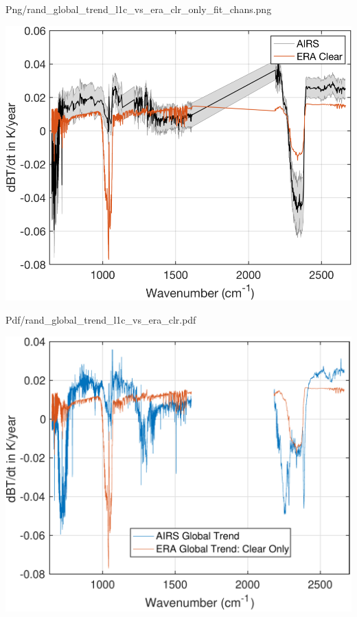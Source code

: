 \documentclass[presentation]{beamer}
\begin{document}
\begin{frame}[label={sec:orgda91197}]{Png/rand\_global\_trend\_l1c\_vs\_era\_clr\_only\_fit\_chans.png}
\begin{center}
\includegraphics[width=0.7\linewidth]{./Figs/Png/rand_global_trend_l1c_vs_era_clr_only_fit_chans.png}
\end{center}
\end{frame}

\begin{frame}[label={sec:org0463493}]{Pdf/rand\_global\_trend\_l1c\_vs\_era\_clr.pdf}
\begin{center}
\includegraphics[width=0.7\linewidth]{./Figs/Pdf/rand_global_trend_l1c_vs_era_clr.pdf}
\end{center}
\end{frame}
\end{document}
